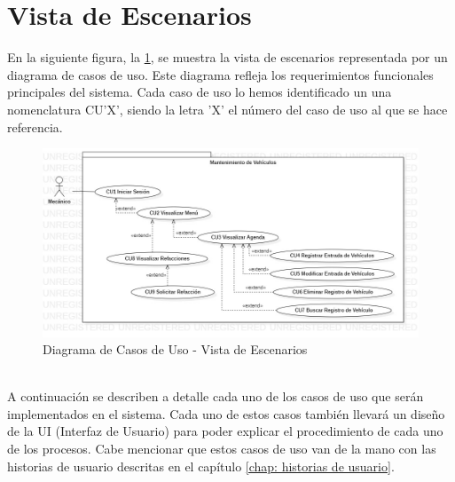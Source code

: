 \section{Vista de Escenarios}
En la siguiente figura, la \ref{fig:Diagrama de Casos de Uso - Vista de Escenarios}, se muestra la vista de escenarios representada por un diagrama de casos de uso. Este diagrama refleja los requerimientos funcionales principales del sistema. Cada caso de uso lo hemos identificado un una nomenclatura CU'X', siendo la letra 'X' el número del caso de uso al que se hace referencia.
\\
\begin{figure}[!h]
	\centering
	\includegraphics[width=1\textwidth]{./diseno/vescenarios/imagenes/vistaEscenarios}
	\caption{Diagrama de Casos de Uso - Vista de Escenarios}
	\label{fig:Diagrama de Casos de Uso - Vista de Escenarios}
\end{figure}
\\
A continuación se describen a detalle cada uno de los casos de uso que serán implementados en el sistema. Cada uno de estos casos también llevará un diseño de la UI (Interfaz de Usuario) para poder explicar el procedimiento de cada uno de los procesos. Cabe mencionar que estos casos de uso van de la mano con las historias de usuario descritas en el capítulo \ref{chap: historias de usuario}. 

\clearpage










